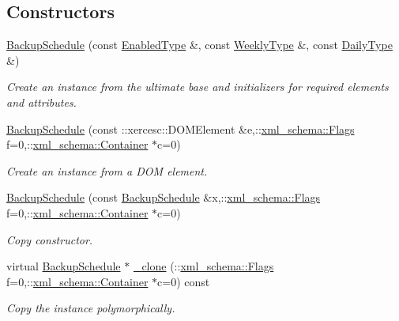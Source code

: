 \subsection*{Constructors}
\begin{DoxyCompactItemize}
\item 
\hypertarget{classopenstack_1_1xml_1_1BackupSchedule_a1c2cc5b89243c039dd3d86708efa02f1}{
\hyperlink{classopenstack_1_1xml_1_1BackupSchedule_a1c2cc5b89243c039dd3d86708efa02f1}{BackupSchedule} (const \hyperlink{classopenstack_1_1xml_1_1BackupSchedule_a4a4b5000949fa636b9d7fc6f4ca4250b}{EnabledType} \&, const \hyperlink{classopenstack_1_1xml_1_1WeeklyBackup}{WeeklyType} \&, const \hyperlink{classopenstack_1_1xml_1_1DailyBackup}{DailyType} \&)}
\label{classopenstack_1_1xml_1_1BackupSchedule_a1c2cc5b89243c039dd3d86708efa02f1}

\begin{DoxyCompactList}\small\item\em Create an instance from the ultimate base and initializers for required elements and attributes. \item\end{DoxyCompactList}\item 
\hyperlink{classopenstack_1_1xml_1_1BackupSchedule_ac2435e90a6c6f44323370da24c5ec531}{BackupSchedule} (const ::xercesc::DOMElement \&e,::\hyperlink{namespacexml__schema_affb4c227cbd9aa7453dd1dc5a1401943}{xml\_\-schema::Flags} f=0,::\hyperlink{namespacexml__schema_a333dea2213742aea47a37532dec4ec27}{xml\_\-schema::Container} $\ast$c=0)
\begin{DoxyCompactList}\small\item\em Create an instance from a DOM element. \item\end{DoxyCompactList}\item 
\hyperlink{classopenstack_1_1xml_1_1BackupSchedule_ae17cb6ab25fff5819368f0a2ead27a89}{BackupSchedule} (const \hyperlink{classopenstack_1_1xml_1_1BackupSchedule}{BackupSchedule} \&x,::\hyperlink{namespacexml__schema_affb4c227cbd9aa7453dd1dc5a1401943}{xml\_\-schema::Flags} f=0,::\hyperlink{namespacexml__schema_a333dea2213742aea47a37532dec4ec27}{xml\_\-schema::Container} $\ast$c=0)
\begin{DoxyCompactList}\small\item\em Copy constructor. \item\end{DoxyCompactList}\item 
virtual \hyperlink{classopenstack_1_1xml_1_1BackupSchedule}{BackupSchedule} $\ast$ \hyperlink{classopenstack_1_1xml_1_1BackupSchedule_a41fca1f0747411188f71a16cba685544}{\_\-clone} (::\hyperlink{namespacexml__schema_affb4c227cbd9aa7453dd1dc5a1401943}{xml\_\-schema::Flags} f=0,::\hyperlink{namespacexml__schema_a333dea2213742aea47a37532dec4ec27}{xml\_\-schema::Container} $\ast$c=0) const 
\begin{DoxyCompactList}\small\item\em Copy the instance polymorphically. \item\end{DoxyCompactList}\end{DoxyCompactItemize}


